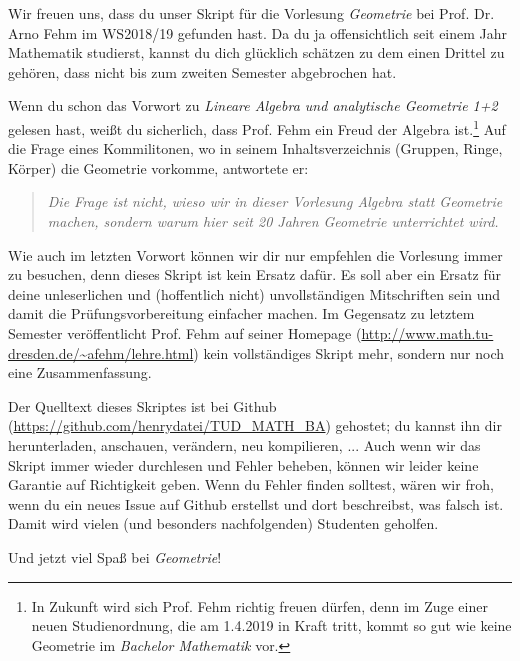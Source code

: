 Wir freuen uns, dass du unser Skript für die Vorlesung \textit{Geometrie} bei Prof. Dr. Arno Fehm im WS2018/19 gefunden hast. Da du ja offensichtlich seit einem Jahr Mathematik studierst, kannst du dich glücklich schätzen zu dem einen Drittel zu gehören, dass nicht bis zum zweiten Semester abgebrochen hat.

Wenn du schon das Vorwort zu \textit{Lineare Algebra und analytische Geometrie 1+2} gelesen hast, weißt du sicherlich, dass Prof. Fehm ein Freud der Algebra ist.\footnote{In Zukunft wird sich Prof. Fehm richtig freuen dürfen, denn im Zuge einer neuen Studienordnung, die am 1.4.2019 in Kraft tritt, kommt so gut wie keine Geometrie im \textit{Bachelor Mathematik} vor.} Auf die Frage eines Kommilitonen, wo in seinem Inhaltsverzeichnis (Gruppen, Ringe, Körper) die Geometrie vorkomme, antwortete er:
\begin{quote}
	\textit{Die Frage ist nicht, wieso wir in dieser Vorlesung Algebra statt Geometrie machen, sondern warum hier seit 20 Jahren Geometrie unterrichtet wird.}
\end{quote}

Wie auch im letzten Vorwort können wir dir nur empfehlen die Vorlesung immer zu besuchen, denn dieses Skript ist kein Ersatz dafür. Es soll aber ein Ersatz für deine unleserlichen und (hoffentlich nicht) unvollständigen Mitschriften sein und damit die Prüfungsvorbereitung einfacher machen. Im Gegensatz zu letztem Semester veröffentlicht Prof. Fehm auf seiner Homepage (\url{http://www.math.tu-dresden.de/~afehm/lehre.html}) kein vollständiges Skript mehr, sondern nur noch eine Zusammenfassung.

Der Quelltext dieses Skriptes ist bei Github (\url{https://github.com/henrydatei/TUD_MATH_BA}) gehostet; du kannst ihn dir herunterladen, anschauen, verändern, neu kompilieren, ... Auch wenn wir das Skript immer wieder durchlesen und Fehler beheben, können wir leider keine Garantie auf Richtigkeit geben. Wenn du Fehler finden solltest, wären wir froh, wenn du ein neues Issue auf Github erstellst und dort beschreibst, was falsch ist. Damit wird vielen (und besonders nachfolgenden) Studenten geholfen.

Und jetzt viel Spaß bei \textit{Geometrie}!